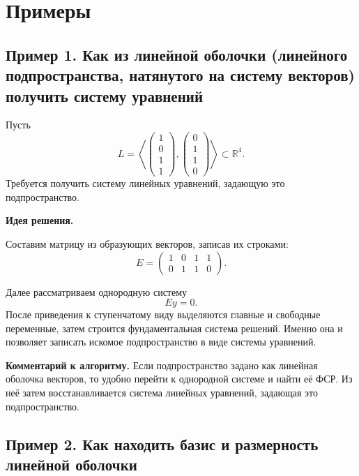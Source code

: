 \section*{Примеры}

\subsection*{Пример 1. Как из линейной оболочки (линейного подпространства, натянутого на систему векторов) получить систему уравнений}

Пусть
\[
L=
\left\langle
\begin{pmatrix}
1\\0\\1\\1
\end{pmatrix},
\begin{pmatrix}
0\\1\\1\\0
\end{pmatrix}
\right\rangle
\subset \mathbb{R}^4.
\]
Требуется получить систему линейных уравнений, задающую это подпространство.

\textbf{Идея решения.}

Составим матрицу из образующих векторов, записав их строками:
\[
E=
\begin{pmatrix}
1&0&1&1\\
0&1&1&0
\end{pmatrix}.
\]

Далее рассматриваем однородную систему
\[
Ey=0.
\]
После приведения к ступенчатому виду выделяются главные и свободные переменные, затем строится фундаментальная система решений. Именно она и позволяет записать искомое подпространство в виде системы уравнений.

\medskip
\noindent
\textbf{Комментарий к алгоритму.}
Если подпространство задано как линейная оболочка векторов, то удобно перейти к однородной системе и найти её ФСР. Из неё затем восстанавливается система линейных уравнений, задающая это подпространство.

\subsection*{Пример 2. Как находить базис и размерность линейной оболочки}

